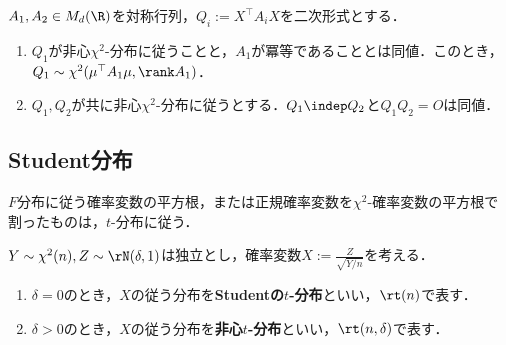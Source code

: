 \documentclass[uplatex,dvipdfmx]{jsreport}
\begin{document}
\begin{corollary}
    $A_1,A_2\in M_d(\R)$を対称行列，$Q_i:=X^\top A_iX$を二次形式とする．
    \begin{enumerate}
        \item $Q_1$が非心$\chi^2$-分布に従うことと，$A_1$が冪等であることとは同値．このとき，$Q_1\sim\chi^2(\mu^\top A_1\mu,\rank A_1)$．
        \item $Q_1,Q_2$が共に非心$\chi^2$-分布に従うとする．$Q_1\indep Q_2$と$Q_1Q_2=O$は同値．
    \end{enumerate}
\end{corollary}

\subsection{Student分布}

\begin{tcolorbox}[colframe=ForestGreen, colback=ForestGreen!10!white,breakable,colbacktitle=ForestGreen!40!white,coltitle=black,fonttitle=\bfseries\sffamily,
title=]
    $F$分布に従う確率変数の平方根，または正規確率変数を$\chi^2$-確率変数の平方根で割ったものは，$t$-分布に従う．
\end{tcolorbox}

\begin{definition}
    $Y\sim\chi^2(n),Z\sim\rN(\delta,1)$は独立とし，確率変数$X:=\frac{Z}{\sqrt{Y/n}}$を考える．
    \begin{enumerate}
        \item $\delta=0$のとき，$X$の従う分布を\textbf{Studentの$t$-分布}といい，$\rt(n)$で表す．
        \item $\delta>0$のとき，$X$の従う分布を\textbf{非心$t$-分布}といい，$\rt(n,\delta)$で表す．
    \end{enumerate}
\end{definition}
\end{document}
